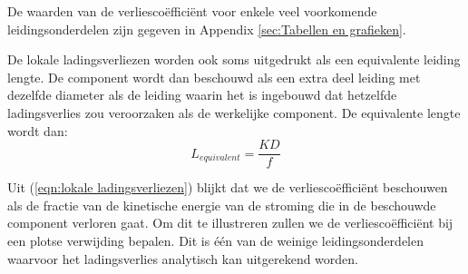 De waarden van de verliescoëfficiënt voor enkele veel voorkomende leidingsonderdelen zijn gegeven in Appendix \ref{sec:Tabellen en grafieken}.

De lokale ladingsverliezen worden ook soms uitgedrukt als een equivalente leiding lengte. De component wordt dan beschouwd als een extra deel leiding met dezelfde diameter als de leiding waarin het is ingebouwd dat hetzelfde ladingsverlies zou veroorzaken als de werkelijke component. De equivalente lengte wordt dan:
\begin{equation}
	L_{equivalent} = \frac{K D}{f}
\end{equation}

Uit (\ref{eqn:lokale ladingsverliezen}) blijkt dat we de verliescoëfficiënt beschouwen als de fractie van de kinetische energie van de stroming die in de beschouwde component verloren gaat. Om dit te illustreren zullen we de verliescoëfficiënt bij een plotse verwijding bepalen. Dit is één van de weinige leidingsonderdelen waarvoor het ladingsverlies analytisch kan uitgerekend worden.


